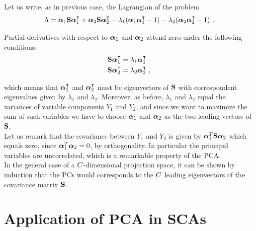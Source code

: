 Let us write, as in previous case, the Lagrangian of the problem
\begin{equation}
\Lambda = \boldsymbol{\alpha}_1 \textbf{S} \boldsymbol{\alpha}_1^\intercal + \boldsymbol{\alpha}_2\textbf{S} \boldsymbol{\alpha}_2^\intercal - \lambda_1(\boldsymbol{\alpha}_1\boldsymbol{\alpha}_1^\intercal -1) - \lambda_2(\boldsymbol{\alpha}_2\boldsymbol{\alpha}_2^\intercal -1) \mbox{ .}
\end{equation}

Partial derivatives with respect to $\boldsymbol{\alpha}_1$ and $\boldsymbol{\alpha}_2$ attend zero under the following conditions:
\begin{align}
\textbf{S}  \boldsymbol{\alpha}_1^\intercal &= \lambda_1\boldsymbol{\alpha}_1^\intercal\\
\textbf{S}  \boldsymbol{\alpha}_2^\intercal &= \lambda_2\boldsymbol{\alpha}_2^\intercal \mbox{ ,}
\end{align}

which means that $\boldsymbol{\alpha}_1^\intercal$ and $\boldsymbol{\alpha}_2^\intercal$ must be eigenvectors of $\textbf{S}$ with correspondent eigenvalues given by $\lambda_1$ and $\lambda_2$. Moreover, as before, $\lambda_1$ and $\lambda_2$ equal the variances of variable components $Y_1$ and $Y_2$, and since we want to maximize the sum of such variables we have to choose $\boldsymbol{\alpha}_1$ and $\boldsymbol{\alpha}_2$ as the two leading vectors of $\textbf{S}$.\\
Let us remark that the covariance between $Y_1$ and $Y_2$ is given by $\boldsymbol{\alpha}_1^T\textbf{S} \boldsymbol{\alpha}_2$ which equals zero, since $\boldsymbol{\alpha}_1^T\boldsymbol{\alpha}_2 = 0$, by orthogonality. In particular the principal variables are uncorrelated, which is a remarkable property of the PCA. \\

In the general case of a $C$-dimensional projection space, it can be shown by induction that the PCs would corresponds to the $C$ leading eigenvectors of the covariance matrix $\textbf{S}$.



\section{Application of PCA in SCAs}\label{sec:PCA_SCA}
